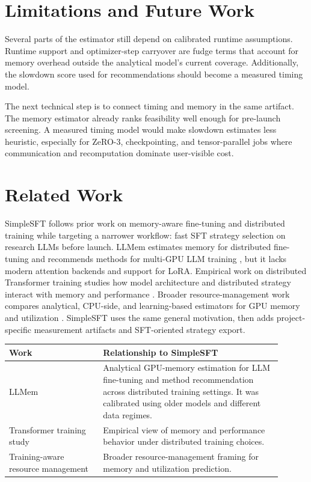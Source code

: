 \section{Limitations and Future Work}
Several parts of the estimator still depend on calibrated runtime assumptions.
Runtime support and optimizer-step carryover are fudge terms that account for memory overhead outside the analytical model's current coverage.
Additionally, the slowdown score used for recommendations should become a measured timing model.

The next technical step is to connect timing and memory in the same artifact.
The memory estimator already ranks feasibility well enough for pre-launch
screening. A measured timing model would make slowdown estimates less
heuristic, especially for ZeRO-3, checkpointing, and tensor-parallel jobs where
communication and recomputation dominate user-visible cost.

\section{Related Work}
SimpleSFT follows prior work on memory-aware fine-tuning and distributed
training while targeting a narrower workflow: fast SFT strategy selection on
research LLMs before launch. LLMem estimates memory for distributed
fine-tuning and recommends methods for multi-GPU LLM training
\cite{kim2024llmem}, but it lacks modern attention backends and support for LoRA. Empirical work on distributed Transformer training
studies how model architecture and distributed strategy interact with memory
and performance \cite{lu2024distributed}. Broader resource-management work
compares analytical, CPU-side, and learning-based estimators for GPU memory and
utilization \cite{yousefzadeh2026gpu}. SimpleSFT uses the same general
motivation, then adds project-specific measurement artifacts and SFT-oriented
strategy export.

\begin{center}
\small
\begin{tabular}{@{}>{\raggedright\arraybackslash}p{0.31\linewidth}p{0.59\linewidth}@{}}
\toprule
Work & Relationship to SimpleSFT \\
\midrule
LLMem \cite{kim2024llmem} & Analytical GPU-memory estimation for LLM
fine-tuning and method recommendation across distributed training settings. It was calibrated using older models and different data regimes. \\
Transformer training study \cite{lu2024distributed} & Empirical view of
memory and performance behavior under distributed training choices. \\
Training-aware resource management \cite{yousefzadeh2026gpu} & Broader
resource-management framing for memory and utilization prediction. \\
\bottomrule
\end{tabular}
\normalsize
\end{center}

